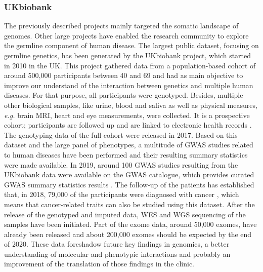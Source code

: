 \subsubsection*{UKbiobank}
The previously described projects mainly targeted the somatic landscape of genomes. Other large projects have enabled the research community to explore the germline component of human disease. The largest public dataset, focusing on germline genetics, has been generated by the UKbiobank project, which started in 2010 in the UK. This project gathered data from a population-based cohort of around 500,000 participants between 40 and 69 \cite{Bahcall2018} and had as main objective to improve our understand of the interaction between genetics and multiple human diseases. For that purpose, all participants were genotyped. Besides, multiple other biological samples, like urine, blood and saliva as well as physical measures, \textit{e.g.} brain \gls{MRI}, heart and eye measurements, were collected. It is a prospective cohort; participants are followed up and are linked to electronic health records \cite{Bycroft2018}. The genotyping data of the full cohort were released in 2017. Based on this dataset and the large panel of phenotypes, a multitude of \gls{GWAS} studies related to human diseases have been performed and their resulting summary statistics were made available. In 2019, around 100 \gls{GWAS} studies resulting from the UKbiobank data were available on the \gls{GWAS} catalogue, which provides curated \gls{GWAS} summary statistics results \cite{Buniello2019}. The follow-up of the patients has established that, in 2018, 79,000 of the participants were diagnosed with cancer \cite{Bycroft2018}, which means that cancer-related traits can also be studied using this dataset. After the release of the genotyped and imputed data, \gls{WES} and \gls{WGS} sequencing of the samples have been initiated. Part of the exome data, around 50,000 exomes, have already been released and about 200,000 exomes should be expected by the end of 2020. These data foreshadow future key findings in genomics, a better understanding of molecular and phenotypic interactions and probably an improvement of the translation of those findings in the clinic.%



